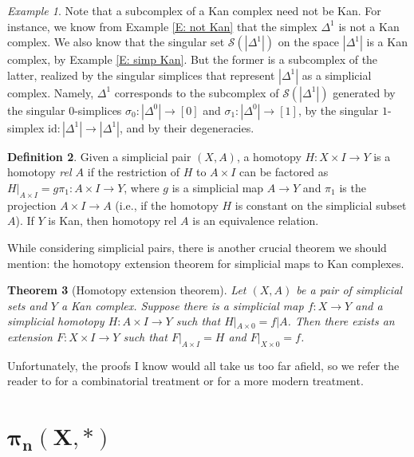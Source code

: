 \documentclass[12pt]{article}
\theoremstyle{plain}
\newtheorem{theorem}{Theorem}[section]
\theoremstyle{definition}
\newtheorem{definition}[theorem]{Definition}
\theoremstyle{remark}
\newtheorem{example}[theorem]{Example}
\newcommand{\ms}[1]{\mathscr{#1}}
\begin{document}
\begin{example}
Note that  a subcomplex of a Kan complex need not be Kan. For instance, we know from Example \ref{E: not Kan} that the simplex $\Delta^1$ is not a Kan complex. We also know that the singular set $\ms S(|\Delta^1|)$ on the space $|\Delta^1|$ is a Kan complex, by Example \ref{E: simp Kan}. But the former is a subcomplex of the latter, realized by the singular simplices that represent $|\Delta^1|$ as a simplicial complex.  Namely, $\Delta^1$ corresponds to the subcomplex of $\ms S(|\Delta^1|)$ generated by the singular $0$-simplices $\sigma_0\colon |\Delta^0|\to [0]$ and $\sigma_1\colon |\Delta^0|\to [1]$, by the singular $1$-simplex $\text{id}\colon |\Delta^1|\to|\Delta^1|$, and by their degeneracies.
\end{example}


\begin{definition}
Given a simplicial pair $(X,A)$, a homotopy $H\colon X\times I\to Y$ is a homotopy \emph{rel $A$} if the restriction of $H$ to $A\times I$ can be factored as $H|_{A\times I}=g\pi_1\colon A\times I\to Y$, where $g$ is a simplicial map $A\to Y$ and $\pi_1$ is the projection $A\times I\to A$ (i.e., if the homotopy $H$ is constant on the simplicial subset $A$). If $Y$ is Kan, then homotopy rel $A$ is an equivalence relation. 
\end{definition}

While considering simplicial pairs, there is another crucial theorem we should mention: the homotopy extension theorem for simplicial maps to Kan complexes.

\begin{theorem}[Homotopy extension theorem]\label{T: HET}
Let $(X,A)$ be a pair of simplicial sets and $Y$  a Kan complex. Suppose there is a simplicial map $f\colon X\to Y$ and a simplicial homotopy $H\colon  A\times I\to Y$ such that $H|_{A\times 0}=f|A$. Then there exists an extension $F\colon X\times I\to Y$ such that $F|_{A\times I}=H$ and $F|_{X\times 0}=f$. 
\end{theorem}

Unfortunately, the proofs I know would all take us too far afield, so we refer the reader to \cite[Chapter 1, Appendix A]{MOORE} for a combinatorial treatment or \cite[Section I.4]{GoeJar} for a more modern treatment.


\section{$\mathbf{\pi_n(X, *)}$}\label{S: pin}
\end{document}
